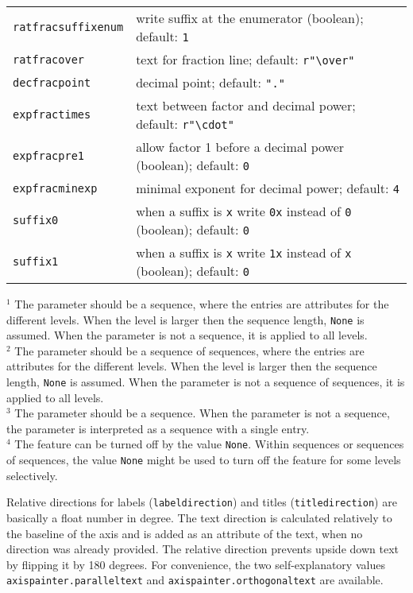 \begin{tabularx}{\linewidth}{l>{\raggedright\arraybackslash}X}
\texttt{ratfracsuffixenum}&write suffix at the enumerator (boolean); default: \texttt{1}\\
\texttt{ratfracover}&text for fraction line; default: \texttt{r"\textbackslash over"}\\
\texttt{decfracpoint}&decimal point; default: \texttt{"."}\\
\texttt{expfractimes}&text between factor and decimal power; default: \texttt{r"\textbackslash cdot"}\\
\texttt{expfracpre1}&allow factor 1 before a decimal power (boolean); default: \texttt{0}\\
\texttt{expfracminexp}&minimal exponent for decimal power; default: \texttt{4}\\
\texttt{suffix0}&when a suffix is \texttt{x} write \texttt{0x} instead of \texttt{0} (boolean); default: \texttt{0}\\
\texttt{suffix1}&when a suffix is \texttt{x} write \texttt{1x} instead of \texttt{x} (boolean); default: \texttt{0}\\
\end{tabularx}
\medskip

$^1$
The parameter should be a sequence, where the entries are attributes
for the different levels. When the level is larger then the sequence
length, \verb|None| is assumed. When the parameter is not a sequence,
it is applied to all levels.\\
$^2$
The parameter should be a sequence of sequences, where the entries are
attributes for the different levels. When the level is larger then the
sequence length, \verb|None| is assumed. When the parameter is not a
sequence of sequences, it is applied to all levels.\\
$^3$
The parameter should be a sequence. When the parameter is not a
sequence, the parameter is interpreted as a sequence with a single
entry.\\
$^4$
The feature can be turned off by the value \verb|None|. Within
sequences or sequences of sequences, the value \verb|None| might be
used to turn off the feature for some levels selectively.
\medskip

Relative directions for labels (\verb|labeldirection|) and titles
(\verb|titledirection|) are basically a float number in degree. The
text direction is calculated relatively to the baseline of the axis
and is added as an attribute of the text, when no direction was
already provided. The relative direction prevents upside down text by
flipping it by 180 degrees. For convenience, the two self-explanatory
values \verb|axispainter.paralleltext| and
\verb|axispainter.orthogonaltext| are available.


